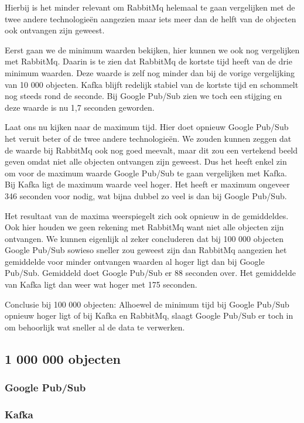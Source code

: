 Hierbij is het minder relevant om RabbitMq helemaal te gaan vergelijken met de twee andere technologieën aangezien maar iets meer dan de helft van de objecten ook ontvangen zijn geweest.

Eerst gaan we de minimum waarden bekijken, hier kunnen we ook nog vergelijken met RabbitMq. Daarin is te zien dat RabbitMq de kortste tijd heeft van de drie minimum waarden. Deze waarde is zelf nog minder dan bij de vorige vergelijking van 10 000 objecten. Kafka blijft redelijk stabiel van de kortste tijd en schommelt nog steeds rond de seconde. Bij Google Pub/Sub zien we toch een stijging en deze waarde is nu 1,7 seconden geworden.

Laat ons nu kijken naar de maximum tijd. Hier doet opnieuw Google Pub/Sub het veruit beter of de twee andere technologieën. We zouden kunnen zeggen dat de waarde bij RabbitMq ook nog goed meevalt, maar dit zou een vertekend beeld geven omdat niet alle objecten ontvangen zijn geweest. Dus het heeft enkel zin om voor de maximum waarde Google Pub/Sub te gaan vergelijken met Kafka. Bij Kafka ligt de maximum waarde veel hoger. Het heeft er maximum ongeveer 346 seconden voor nodig, wat bijna dubbel zo veel is dan bij Google Pub/Sub.

Het resultaat van de maxima weerspiegelt zich ook opnieuw in de gemiddeldes. Ook hier houden we geen rekening met RabbitMq want niet alle objecten zijn ontvangen. We kunnen eigenlijk al zeker concluderen dat bij 100 000 objecten Google Pub/Sub sowieso sneller zou geweest zijn dan RabbitMq aangezien het gemiddelde voor minder ontvangen waarden al hoger ligt dan bij Google Pub/Sub. Gemiddeld doet Google Pub/Sub er 88 seconden over. Het gemiddelde van Kafka ligt dan weer wat hoger met 175 seconden.

Conclusie bij 100 000 objecten: Alhoewel de minimum tijd bij Google Pub/Sub opnieuw hoger ligt of bij Kafka en RabbitMq, slaagt Google Pub/Sub er toch in om behoorlijk wat sneller al de data te verwerken. 

\subsection{1 000 000 objecten}
\subsubsection{Google Pub/Sub}
\subsubsection{Kafka}
